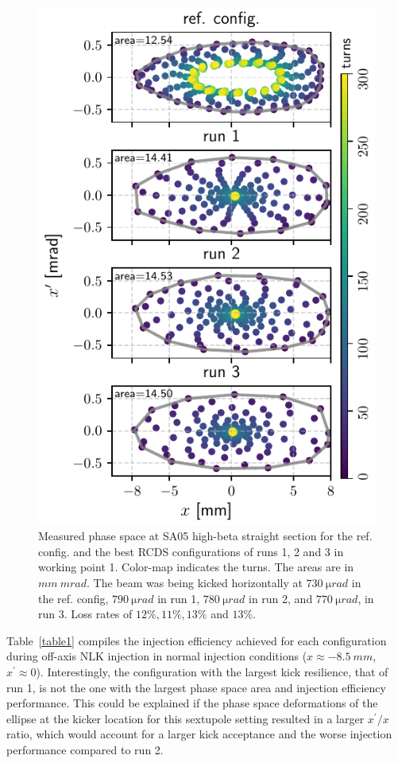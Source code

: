 \documentclass[a4paper,
               keeplastbox,   %
               ]{jacow}
\begin{document}
\begin{figure}[!h]
    \centering
    \includegraphics[width=\columnwidth]{WEPL087_f2.pdf}
    \caption{Measured phase space at SA05 high-beta straight section for the ref. config. and the best RCDS configurations of runs 1, 2 and 3 in working point 1. Color-map indicates the turns. The areas are in $\unit{mm}~\unit{mrad}$. The beam was being kicked horizontally at $730~\unit{\micro rad}$ in the ref. config, $790~\unit{\micro rad}$ in run 1, $780~\unit{\micro rad}$ in run 2, and $770~\unit{\micro rad}$, in run 3. Loss rates of  $12\%, 11\%, 13\%$ and $13\%$.} 
    \label{fig:oldtunes_phase}
\end{figure}
Table~\ref{table1} compiles the injection efficiency achieved for each configuration during off-axis NLK injection in normal injection conditions ($x\approx -8.5~\unit{mm}$, $x^\prime\approx 0 $). 
Interestingly, the configuration with the largest kick resilience, that of run 1, is not the one with the largest phase space area and injection efficiency performance. This could be explained if the phase space deformations of the ellipse at the kicker location for this sextupole setting resulted in a larger $x^\prime/x$ ratio, which would account for a larger kick acceptance and the worse injection performance compared to run 2. 
\end{document}
